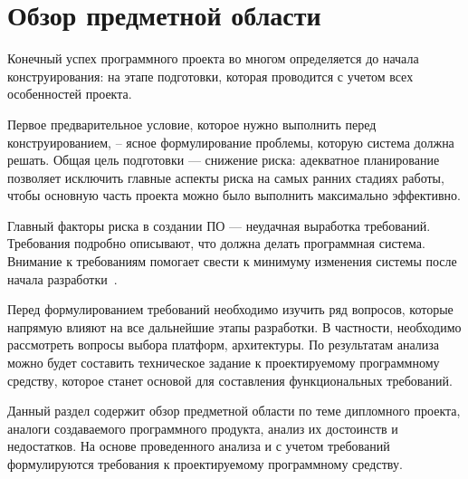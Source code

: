 \section{Обзор предметной области}\label{sec:analysis}

Конечный успех программного проекта во многом определяется до начала конструирования: на этапе подготовки, которая проводится с учетом всех особенностей проекта.
\par
Первое предварительное условие, которое нужно выполнить перед конструированием, – ясное формулирование проблемы, которую система должна решать. Общая цель подготовки — снижение риска: адекватное планирование позволяет исключить главные аспекты риска на самых ранних стадиях работы, чтобы основную часть проекта можно было выполнить максимально эффективно.
\par
Главный факторы риска в создании ПО — неудачная выработка требований. Требования подробно описывают, что должна делать программная система. Внимание к требованиям помогает свести к минимуму изменения системы после начала разработки~\cite{code_complete}.
\par
Перед формулированием требований необходимо изучить ряд вопросов, которые напрямую влияют на все дальнейшие этапы разработки. В частности, необходимо рассмотреть вопросы выбора платформ, архитектуры. По результатам анализа можно будет составить техническое задание к проектируемому программному средству, которое станет основой для составления функциональных требований.
\par
Данный раздел содержит обзор предметной области по теме дипломного проекта, аналоги создаваемого программного продукта, анализ их достоинств и недостатков. На основе проведенного анализа и с учетом требований формулируются требования к проектируемому программному средству.






